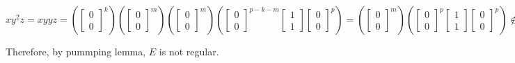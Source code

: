 \begin{enumerate}
          $xy^2z = xyyz = \left(\begin{bmatrix}0 \\0\end{bmatrix}^k\right) \left(\begin{bmatrix}0 \\0\end{bmatrix}^m\right)\left(\begin{bmatrix}0 \\0\end{bmatrix}^m\right)\left(\begin{bmatrix}0 \\0\end{bmatrix}^{p-k-m} \begin{bmatrix}1 \\1\end{bmatrix} \begin{bmatrix}0 \\0\end{bmatrix}^{p}\right) =
              \left(\begin{bmatrix}0 \\0\end{bmatrix}^m\right)\left(\begin{bmatrix}0 \\0\end{bmatrix}^{p} \begin{bmatrix}1 \\1\end{bmatrix} \begin{bmatrix}0 \\0\end{bmatrix}^{p}\right) \notin E$

          Therefore, by pummping lemma, $E$ is not regular.
\end{enumerate}
